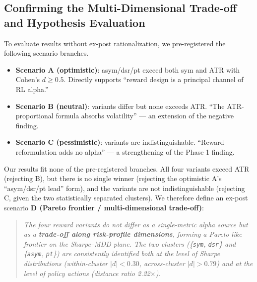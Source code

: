 \documentclass[11pt, a4paper]{article}
\begin{document}
\subsection{Confirming the Multi-Dimensional Trade-off and Hypothesis Evaluation}
\label{sec:pareto_scenario_d}

To evaluate results without ex-post rationalization, we pre-registered the
following scenario branches.

\begin{itemize}[leftmargin=*]
\item \textbf{Scenario A (optimistic)}: asym/dsr/pt exceed both sym and ATR
with Cohen's $d \geq 0.5$. Directly supports ``reward design is a principal
channel of RL alpha.''
\item \textbf{Scenario B (neutral)}: variants differ but none exceeds ATR.
``The ATR-proportional formula absorbs volatility'' --- an extension of the
negative finding.
\item \textbf{Scenario C (pessimistic)}: variants are indistinguishable.
``Reward reformulation adds no alpha'' --- a strengthening of the Phase 1
finding.
\end{itemize}

Our results fit none of the pre-registered branches. All four variants
exceed ATR (rejecting B), but there is no single winner (rejecting the
optimistic A's ``asym/dsr/pt lead'' form), and the variants are not
indistinguishable (rejecting C, given the two statistically separated
clusters). We therefore define an ex-post scenario \textbf{D (Pareto frontier /
multi-dimensional trade-off)}:

\begin{quote}
\emph{The four reward variants do not differ as a single-metric alpha source
but as a \textbf{trade-off along risk-profile dimensions}, forming a
Pareto-like frontier on the Sharpe--MDD plane. The two clusters
(\{\texttt{sym}, \texttt{dsr}\} and \{\texttt{asym}, \texttt{pt}\}) are
consistently identified both at the level of Sharpe distributions
(within-cluster $|d|<0.30$, across-cluster $|d|>0.79$) and at the level of
policy actions (distance ratio 2.22$\times$).}
\end{quote}
\end{document}
